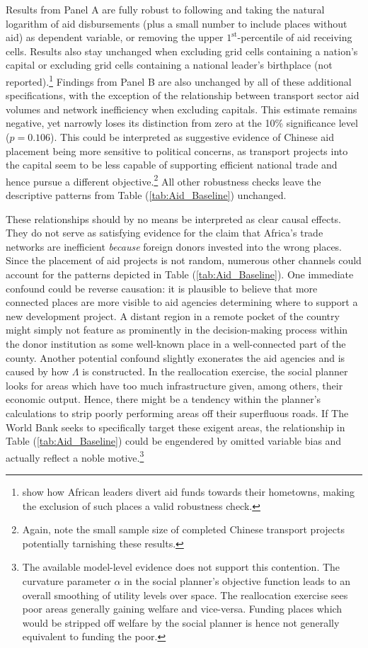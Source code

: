 \documentclass[11pt, oneside]{article}   	%
\let\oldref\ref
\renewcommand{\ref}[1]{(\oldref{#1})}
\begin{document}
Results from Panel A are fully robust to following \cite{Dreher_Aidgrowthregional_2015} and taking the natural logarithm of aid disbursements (plus a small number to include places without aid) as dependent variable, or removing the upper $1^{\textrm{st}}$-percentile of aid receiving cells. Results also stay unchanged when excluding grid cells containing a nation's capital or excluding grid cells containing a national leader's birthplace (not reported).\footnote{\cite{Dreher_AiddemandAfrican_2016} show how African leaders divert aid funds towards their hometowns, making the exclusion of such places a valid robustness check.} Findings from Panel B are also unchanged by all of these additional specifications, with the exception of the relationship between transport sector aid volumes and network inefficiency when excluding capitals. This estimate remains negative, yet narrowly loses its distinction from zero at the 10\% significance level ($p = 0.106$). This could be interpreted as suggestive evidence of Chinese aid placement being more sensitive to political concerns, as transport projects into the capital seem to be less capable of supporting efficient national trade and hence pursue a different objective.\footnote{Again, note the small sample size of completed Chinese transport projects potentially tarnishing these results.} All other robustness checks leave the descriptive patterns from Table \ref{tab:Aid_Baseline} unchanged.

These relationships should by no means be interpreted as clear causal effects. They do not serve as satisfying evidence for the claim that Africa's trade networks are inefficient \emph{because} foreign donors invested into the wrong places. Since the placement of aid projects is not random, numerous other channels could account for the patterns depicted in Table \ref{tab:Aid_Baseline}. One immediate confound could be reverse causation: it is plausible to believe that more connected places are more visible to aid agencies determining where to support a new development project. A distant region in a remote pocket of the country might simply not feature as prominently in the decision-making process within the donor institution as some well-known place in a well-connected part of the county. Another potential confound slightly exonerates the aid agencies and is caused by how $\Lambda$ is constructed. In the reallocation exercise, the social planner looks for areas which have too much infrastructure given, among others, their economic output. Hence, there might be a tendency within the planner's calculations to strip poorly performing areas off their superfluous roads. If The World Bank seeks to specifically target these exigent areas, the relationship in Table \ref{tab:Aid_Baseline} could be engendered by omitted variable bias and actually reflect a noble motive.\footnote{The available model-level evidence does not support this contention. The curvature parameter $\alpha$ in the social planner's objective function leads to an overall smoothing of utility levels over space. The reallocation exercise sees poor areas generally gaining welfare and vice-versa. Funding places which would be stripped off welfare by the social planner is hence not generally equivalent to funding the poor.}
\end{document}
